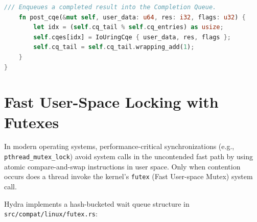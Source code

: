 \begin{lstlisting}[language=Rust, caption={Core Structures and Dispatch for \texttt{io\_uring} (\texttt{src/compat/linux/io\_uring.rs})}]
    /// Enqueues a completed result into the Completion Queue.
    fn post_cqe(&mut self, user_data: u64, res: i32, flags: u32) {
        let idx = (self.cq_tail % self.cq_entries) as usize;
        self.cqes[idx] = IoUringCqe { user_data, res, flags };
        self.cq_tail = self.cq_tail.wrapping_add(1);
    }
}
\end{lstlisting}

\section{Fast User-Space Locking with Futexes}
\label{sec:code_futex_annotated}

In modern operating systems, performance-critical synchronizations (e.g., \texttt{pthread\_mutex\_lock}) avoid system calls in the uncontended fast path by using atomic compare-and-swap instructions in user space. Only when contention occurs does a thread invoke the kernel's \texttt{futex} (Fast User-space Mutex) system call.

Hydra implements a hash-bucketed wait queue structure in \texttt{src/compat/linux/futex.rs}:


